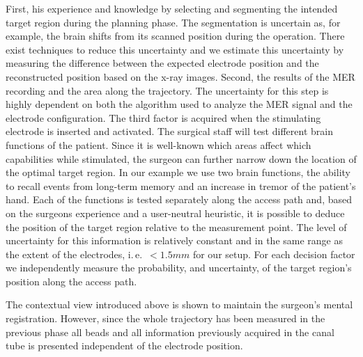 \documentclass[review]{vgtc}                 %
\begin{document}
First, his experience and knowledge by selecting and segmenting the intended target region during the planning phase. The segmentation is uncertain as, for example, the brain shifts from its scanned position during the operation. There exist techniques to reduce this uncertainty and we estimate this uncertainty by measuring the difference between the expected electrode position and the reconstructed position based on the x-ray images. Second, the results of the MER recording and the area along the trajectory. The uncertainty for this step is highly dependent on both the algorithm used to analyze the MER signal and the electrode configuration. The third factor is acquired when the stimulating electrode is inserted and activated. The surgical staff will test different brain functions of the patient. Since it is well-known which areas affect which capabilities while stimulated, the surgeon can further narrow down the location of the optimal target region. In our example we use two brain functions, the ability to recall events from long-term memory and an increase in tremor of the patient's hand. Each of the functions is tested separately along the access path and, based on the surgeons experience and a user-neutral heuristic, it is possible to deduce the position of the target region relative to the measurement point. The level of uncertainty for this information is relatively constant and in the same range as the extent of the electrodes, i.\,e.~$< 1.5 mm$ for our setup. For each decision factor we independently measure the probability, and uncertainty, of the target region's position along the access path.

The contextual view introduced above is shown to maintain the surgeon's mental registration. However, since the whole trajectory has been measured in the previous phase all beads and all information previously acquired in the canal tube is presented independent of the electrode position. 
\end{document}
